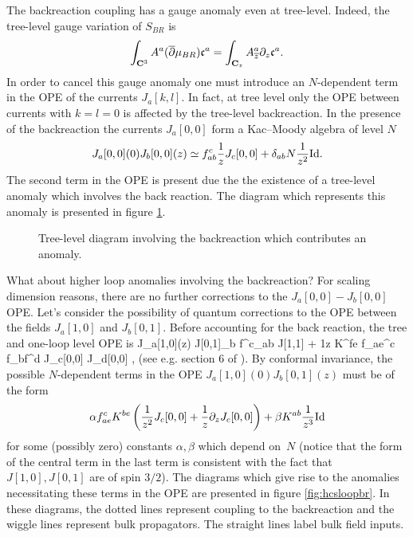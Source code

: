 \documentclass[../main.tex]{subfiles}
\begin{document}
The backreaction coupling has a gauge anomaly even at tree-level.
Indeed, the tree-level gauge variation of $S_{BR}$ is
\[
\int_{\mathbf{C}^3} A^a (\overline{\partial} \mu_{BR}) \mathfrak{c}^a = \int_{\mathbf{C}_z} A_{{\overline{z}}}^a \partial_z \mathfrak{c}^a .
\]
In order to cancel this gauge anomaly one must introduce an $N$-dependent term in the OPE of the currents $J_a[k,l]$. 
In fact, at tree level only the OPE between currents with $k=l=0$ 
is affected by the tree-level backreaction.
In the presence of the backreaction the currents $J_a[0,0]$ form a Kac--Moody algebra of level $N$
\[
J_a[0,0] (0) J_b [0,0] (z) \simeq f_{ab}^c \frac1z J_c[0,0] + \delta_{ab} N \frac1{z^2} {\rm Id} .
\]
The second term in the OPE is present due the the existence of a tree-level anomaly which involves the back reaction.
The diagram which represents this anomaly is presented in figure \ref{fig:hcstreebr}.

\begin{figure}
	\label{fig:hcstreebr}
	\caption{Tree-level diagram involving the backreaction which contributes an anomaly.}  
\end{figure}

What about higher loop anomalies involving the backreaction?
For scaling dimension reasons, there are no further corrections to the $J_a[0,0]-J_b[0,0]$ OPE.
Let's consider the possibility of quantum corrections to the OPE between the fields $J_a[1,0]$ and $J_b[0,1]$. 
Before accounting for the back reaction, the tree and one-loop level OPE is 
\beqn\label{eqn:Jbr}
J_a[1,0](z) J[0,1]_b \simeq {} f^c_{ab} J[1,1] + \hbar \frac1z K^{fe} f_{ae}^c f_{bf}^d J_c[0,0] J_d[0,0] ,
\eeqn
(see e.g. section 6 of \cite{CP}).
By conformal invariance, the possible $N$-dependent terms in the OPE $J_a[1,0] (0) J_b [0,1](z)$ must be of the form
\[
\alpha f^c_{ae} K^{be}  \left(\frac{1}{z^2} J_c[0,0] + \frac{1}{z} \partial_z J_c[0,0] \right) + \beta K^{ab} \frac{1}{z^3} {\rm Id} 
\]
for some (possibly zero) constants $\alpha,\beta$ which depend on~$N$
(notice that the form of the central term in the last term is consistent with the fact that $J[1,0], J[0,1]$ are of spin $3/2$).
The diagrams which give rise to the anomalies necessitating these terms in the OPE are presented in figure \ref{fig:hcsloopbr}.
In these diagrams, the dotted lines represent coupling to the backreaction and the wiggle lines represent bulk propagators.
The straight lines label bulk field inputs.
\end{document}
